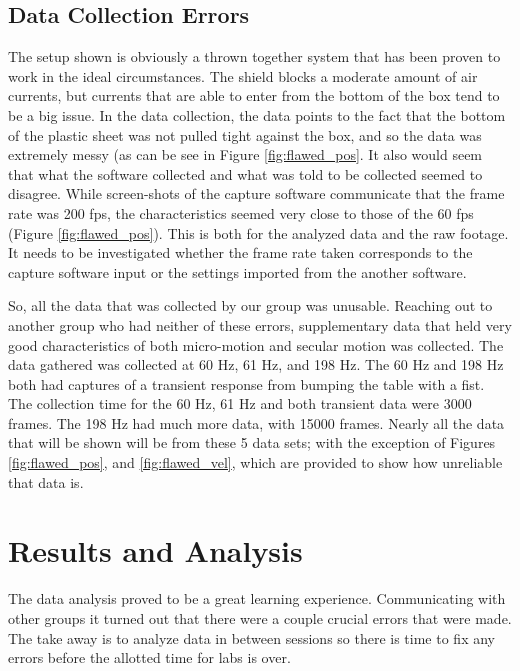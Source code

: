 \documentclass[12pt]{article}
\begin{document}
\subsection{Data Collection Errors}
The setup shown is obviously a thrown together system that has been proven to work in the ideal circumstances. The shield blocks a moderate amount of air currents, but currents that are able to enter from the bottom of the box tend to be a big issue. In the data collection, the data points to the fact that the bottom of the plastic sheet was not pulled tight against the box, and so the data was extremely messy (as can be see in Figure \ref{fig:flawed_pos}. It also would seem that what the software collected and what was told to be collected seemed to disagree. While screen-shots of the capture software communicate that the frame rate was 200 fps, the characteristics seemed very close to those of the 60 fps (Figure \ref{fig:flawed_pos}). This is both for the analyzed data and the raw footage. It needs to be investigated whether the frame rate taken corresponds to the capture software input or the settings imported from the another software.

So, all the data that was collected by our group was unusable. Reaching out to another group who had neither of these errors, supplementary data that held very good characteristics of both micro-motion and secular motion was collected. The data gathered was collected at 60 Hz, 61 Hz, and 198 Hz. The 60 Hz and 198 Hz both had captures of a transient response from bumping the table with a fist. The collection time for the 60 Hz, 61 Hz and both transient data were 3000 frames. The 198 Hz had much more data, with 15000 frames. Nearly all the data that will be shown will be from these 5 data sets; with the exception of Figures \ref{fig:flawed_pos}, and \ref{fig:flawed_vel}, which are provided to show how unreliable that data is. 


\section{Results and Analysis}
The data analysis proved to be a great learning experience. Communicating with other groups it turned out that there were a couple crucial errors that were made. The take away is to analyze data in between sessions so there is time to fix any errors before the allotted time for labs is over. 
\end{document}
